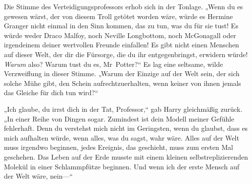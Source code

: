 Die Stimme des Verteidigungsprofessors erhob sich in der Tonlage. „Wenn du es gewesen wärst, der von diesem Troll getötet worden wäre, würde es Hermine Granger nicht einmal in den Sinn kommen, das zu tun, was du für sie tust! Es würde weder Draco Malfoy, noch Neville Longbottom, noch McGonagall oder irgendeinem deiner wertvollen Freunde einfallen! Es gibt nicht einen Menschen auf dieser Welt, der dir die Fürsorge, die du ihr entgegenbringst, erwidern würde! \emph{Warum} also? Warum tust du es, Mr~Potter?“
Es lag eine seltsame, wilde Verzweiflung in dieser Stimme.
„Warum der Einzige auf der Welt sein, der sich solche Mühe gibt, den Schein aufrechtzuerhalten, wenn keiner von ihnen jemals das Gleiche für dich tun wird?“

„Ich glaube, du irrst dich in der Tat, Professor,“ gab Harry gleichmäßig zurück. „In einer Reihe von Dingen sogar. Zumindest ist dein Modell meiner Gefühle fehlerhaft. Denn du verstehst mich nicht im Geringsten, wenn du glaubst, dass es mich aufhalten würde, wenn alles, was du sagst, wahr wäre. Alles auf der Welt muss irgendwo beginnen, jedes Ereignis, das geschieht, muss zum ersten Mal geschehen. Das Leben auf der Erde musste mit einem kleinen selbstreplizierenden Molekül in einer Schlammpfütze beginnen. Und wenn ich der erste Mensch auf der Welt wäre, nein—“


